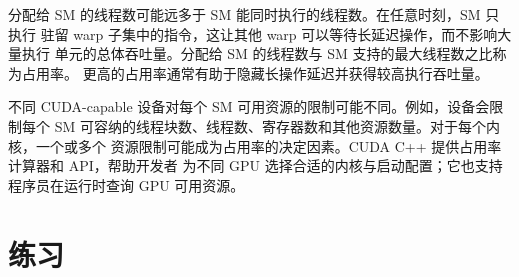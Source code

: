 分配给 SM 的线程数可能远多于 SM 能同时执行的线程数。在任意时刻，SM 只执行
驻留 warp 子集中的指令，这让其他 warp 可以等待长延迟操作，而不影响大量执行
单元的总体吞吐量。分配给 SM 的线程数与 SM 支持的最大线程数之比称为占用率。
更高的占用率通常有助于隐藏长操作延迟并获得较高执行吞吐量。

不同 CUDA-capable 设备对每个 SM 可用资源的限制可能不同。例如，设备会限制每个
SM 可容纳的线程块数、线程数、寄存器数和其他资源数量。对于每个内核，一个或多个
资源限制可能成为占用率的决定因素。CUDA C++ 提供占用率计算器和 API，帮助开发者
为不同 GPU 选择合适的内核与启动配置；它也支持程序员在运行时查询 GPU 可用资源。

\section*{练习}

